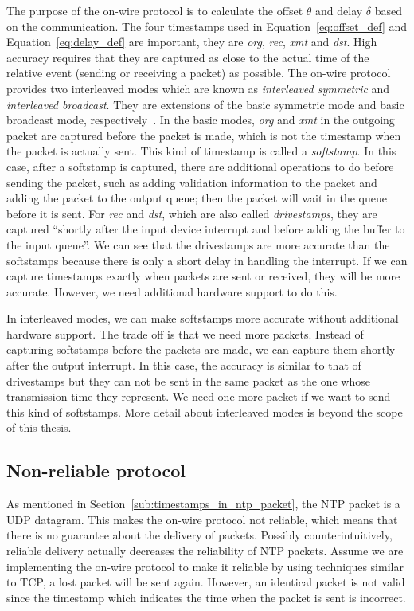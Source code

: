 The purpose of the on-wire protocol is to calculate the offset $\theta$ and
delay $\delta$ based on the communication. The four timestamps used in
Equation~\ref{eq:offset_def} and Equation~\ref{eq:delay_def} are important,
they are \emph{org}, \emph{rec}, \emph{xmt} and \emph{dst}.  High accuracy
requires that they are captured as close to the actual time of the relative
event (sending or receiving a packet) as possible. The on-wire protocol
provides two interleaved modes which are known as \emph{interleaved symmetric}
and \emph{interleaved broadcast}. They are extensions of the basic symmetric
mode and basic broadcast mode, respectively~\cite{on_wire}.
%
In the basic modes, \emph{org} and \emph{xmt} in the outgoing packet are
captured before the packet is made, which is not the timestamp when the packet
is actually sent. 
This kind of timestamp is called a \emph{softstamp}. In this case, 
after a softstamp is captured, there are additional operations to do before
sending the packet, such as adding validation information to the packet and
adding the packet to the output queue; then the packet will wait in the queue
before it is sent.  For \emph{rec} and \emph{dst}, which are also called
\emph{drivestamps}, they are captured ``shortly after the input device
interrupt and before adding the buffer to the input queue''\cite{on_wire}. We
can see that the drivestamps are more accurate than the softstamps because
there is only a short delay in handling the interrupt. If we can capture
timestamps exactly when packets are sent or received, they will be more
accurate. However, we need additional hardware support to do this.

In interleaved modes, we can make softstamps more accurate without
additional hardware support. The trade off is that we need more packets.
Instead of capturing softstamps before the packets are made, we can capture
them shortly after the output interrupt. In this case, the accuracy is similar
to that of drivestamps but they can not be sent in the same packet as the one
whose transmission time they represent. We need one more packet if we want to
send this kind of softstamps. More detail about interleaved modes is beyond
the scope of this thesis.

\subsection{Non-reliable protocol}%
\label{sub:non_reliable_protocol}
As mentioned in Section~\ref{sub:timestamps_in_ntp_packet}, the NTP packet is a
UDP datagram. This makes the on-wire protocol not reliable, which means that
there is no guarantee about the delivery of packets. Possibly
counterintuitively, reliable delivery actually
decreases the reliability of NTP packets. Assume we are implementing the
on-wire protocol to make it reliable by using techniques similar to TCP, a lost
packet will be sent again. However, an identical packet is not valid since the
timestamp which indicates the time when the packet is sent is incorrect.

